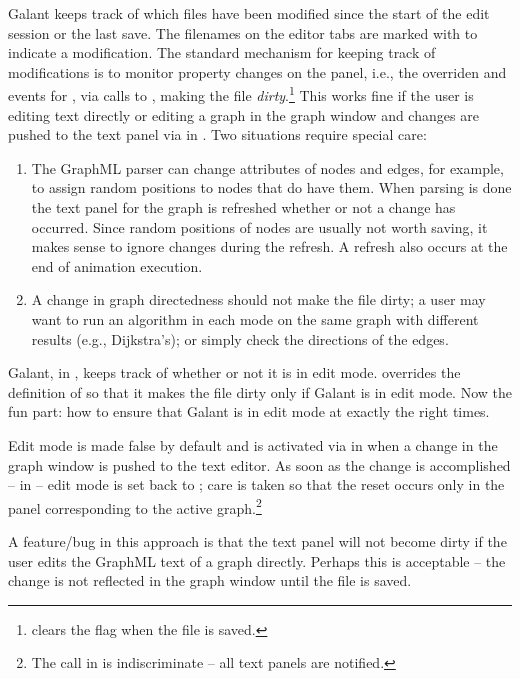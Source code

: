Galant keeps track of which files have been modified since the start of the
edit session or the last save.
The filenames on the editor tabs are marked with \Code{*} to indicate a
modification.
The standard mechanism for keeping track of modifications is to monitor
property changes on the panel, i.e., the overriden  and
 events for , via calls to
, making the file \emph{dirty}.\footnote{
   clears the  flag when the file is
  saved.
}
This works fine if the user is editing text directly or editing a graph in
the graph window and changes are pushed to the text panel via
 in .
Two situations require special care:
\begin{enumerate}
  \item The GraphML parser can change attributes of nodes and edges, for
    example, to assign random positions to nodes that do have them. When
    parsing is done the text panel for the graph is refreshed whether or not
    a change has occurred. Since random positions of nodes are usually not
    worth saving, it makes sense to ignore changes during the refresh.
    A refresh also occurs at the end of animation execution.
  \item A change in graph directedness should not make the file dirty;
    a user may want to run an algorithm in each mode on the same graph with
    different results (e.g., Dijkstra's); or simply check the directions of
    the edges.
\end{enumerate}
Galant, in , keeps track of whether or not it is in edit
mode.
 overrides the definition of  so that
it makes the file dirty only if Galant is in edit mode.
Now the fun part: how to ensure that Galant is in edit mode at exactly the
right times.

Edit mode is made false by default and is activated via
 in  when a change in the graph
window is pushed to the text editor.
As soon as the change is accomplished --  in
 -- edit mode is set back to ;
care is taken so that the reset occurs only in the panel corresponding to the
active graph.\footnote{
  The 
  call in  is indiscriminate -- all text panels are notified.
}

A feature/bug in this approach is that the text panel will not become dirty
if the user edits the GraphML text of a graph directly.
Perhaps this is acceptable -- the change is not reflected in the graph window
until the file is saved.

